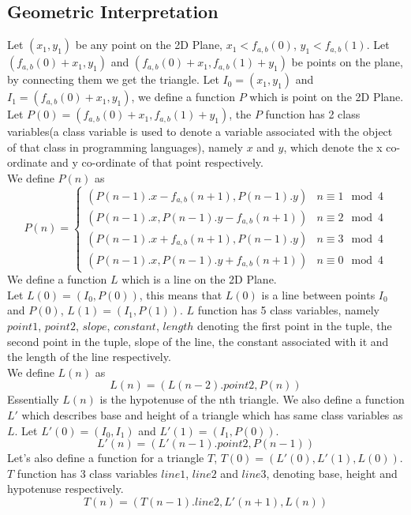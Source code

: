 \documentclass[preprint,12pt]{elsarticle}
\begin{document}
\subsection{Geometric Interpretation}
\label{geo}
Let $(x_1, y_1)$ be any point on the 2D Plane, $x_1 < f_{a,b}(0)$, $y_1 < f_{a,b}(1)$. Let $(f_{a,b}(0) + x_1, y_1)$ and $(f_{a,b}(0) + x_1, f_{a,b}(1) + y_1)$ be points on the plane, by connecting them we get the triangle.
Let $I_0 = (x_1, y_1)$ and $I_1 = (f_{a,b}(0) + x_1, y_1)$, we define a function $P$ which is point on the 2D Plane.\\
Let $P(0) = (f_{a,b}(0) + x_1, f_{a,b}(1) + y_1)$, the $P$ function has 2 class variables(a class variable is used to denote a variable associated with the object of that class in programming languages), namely $x$ and $y$, which denote the x co-ordinate and y co-ordinate of that point respectively.\\
We define $P(n)$ as
\begin{equation*}
	P(n) = \begin{cases}
	(P(n - 1).x - f_{a,b}(n + 1), P(n - 1).y) & n \equiv 1\mod 4\\
	(P(n - 1).x, P(n - 1).y - f_{a,b}(n + 1)) & n \equiv 2\mod 4\\
	(P(n - 1).x + f_{a,b}(n + 1), P(n - 1).y) & n \equiv 3\mod 4\\
	(P(n - 1).x, P(n - 1).y + f_{a,b}(n + 1)) & n \equiv 0\mod 4
	\end{cases}
\end{equation*}
We define a function $L$ which is a line on the 2D Plane.\\
Let $L(0) = (I_0, P(0))$, this means that $L(0)$ is a line between points $I_0$ and $P(0)$, $L(1) = (I_1, P(1))$. $L$ function has 5 class variables, namely $point1$, $point2$, $slope$, $constant$, $length$ denoting the first point in the tuple, the second point in the tuple, slope of the line, the constant associated with it and the length of the line respectively.\\
We define $L(n)$ as $$L(n) = (L(n - 2).point2, P(n))$$ 
Essentially $L(n)$ is the hypotenuse of the nth triangle.
We also define a function $L'$ which describes base and height of a triangle which has same class variables as $L$.
Let $L'(0) = (I_0, I_1)$ and $L'(1) = (I_1, P(0))$.
$$L'(n) = (L'(n - 1).point2, P(n - 1))$$
Let's also define a function for a triangle $T$, $T(0) = (L'(0), L'(1), L(0))$. $T$ function has 3 class variables $line1$, $line2$ and $line3$, denoting base, height and hypotenuse respectively.
$$T(n) = (T(n - 1).line2, L'(n + 1), L(n))$$
\end{document}
